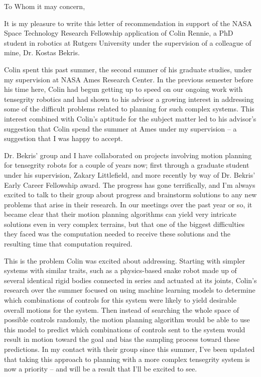 \documentclass[12pt]{letter} %
\begin{document}
\begin{letter}{}
\opening{To Whom it may concern,}

\noindent 

It is my pleasure to write this letter of recommendation in support of the NASA Space Technology Research Fellowship  
application of Colin Rennie, a PhD student in robotics at Rutgers University
under the supervision of a colleague of mine, Dr. Kostas Bekris. 

Colin spent this past summer, the second summer of his graduate studies, under my
supervision at NASA Ames Research Center. In the previous semester before his time here, Colin 
had begun getting up to speed on our ongoing work with tensegrity robotics and 
had shown to his advisor a growing interest in addressing some of the difficult 
problems related to planning for such complex systems. This interest combined with
Colin's aptitude for the subject matter led to his advisor's suggestion that 
Colin spend the summer at Ames under my supervision -- a suggestion that I 
was happy to accept.

Dr. Bekris' group and I have collaborated on projects involving motion planning 
for tensegrity robots for a couple of years now; first through a graduate student 
under his supervision, Zakary Littlefield, and more recently by way of Dr. Bekris' 
Early Career Fellowship award. The progress has gone terrifically, and I'm always 
excited to talk to their group about progress and brainstorm solutions to any 
new problems that arise in their research. In our meetings over the past year or so,
it became clear that their motion planning algorithms can yield very intricate solutions
even in very complex terrains, but that one of the biggest difficulties they faced
was the computation needed to receive these solutions and the resulting time that
computation required. 

This is the problem Colin was excited about addressing. Starting with simpler systems with similar traits,
such as a physics-based snake robot made up of several identical rigid bodies connected in series
and actuated at its joints, Colin's research over the summer focused on using 
machine learning models to determine which combinations of controls for this system 
were likely to yield desirable overall motions for the system. Then instead of searching
the whole space of possible controls randomly, the motion planning algorithm would 
be able to use this model to predict which combinations of controls sent to the system
would result in motion toward the goal and bias the sampling process toward these predictions. 
In my contact with their group since this summer, I've been updated that taking this approach 
to planning with a more complex tensegrity system is now a priority -- and will be a result that I'll 
be excited to see.


\end{letter}
\end{document}
